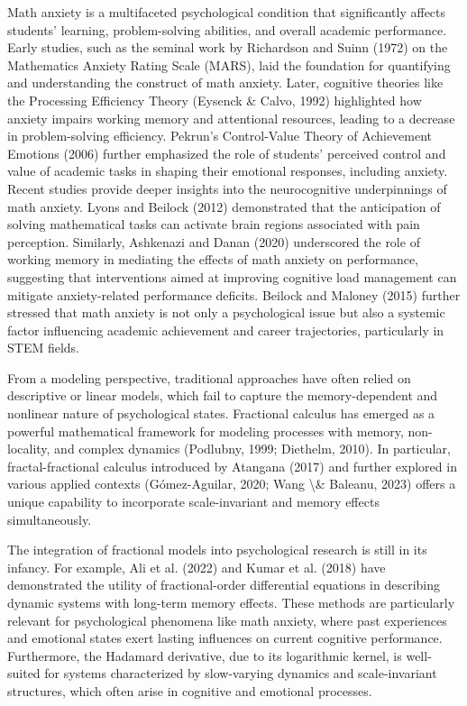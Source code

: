 \documentclass[10pt]{NSP1}
\begin{document}
Math anxiety is a multifaceted psychological condition that significantly affects students’ learning, problem-solving abilities, and overall academic performance. Early studies, such as the seminal work by Richardson and Suinn (1972) on the Mathematics Anxiety Rating Scale (MARS), laid the foundation for quantifying and understanding the construct of math anxiety. Later, cognitive theories like the Processing Efficiency Theory (Eysenck \& Calvo, 1992) highlighted how anxiety impairs working memory and attentional resources, leading to a decrease in problem-solving efficiency. Pekrun’s Control-Value Theory of Achievement Emotions (2006) further emphasized the role of students’ perceived control and value of academic tasks in shaping their emotional responses, including anxiety. Recent studies provide deeper insights into the neurocognitive underpinnings of math anxiety. Lyons and Beilock (2012) demonstrated that the anticipation of solving mathematical tasks can activate brain regions associated with pain perception. Similarly, Ashkenazi and Danan (2020) underscored the role of working memory in mediating the effects of math anxiety on performance, suggesting that interventions aimed at improving cognitive load management can mitigate anxiety-related performance deficits. Beilock and Maloney (2015) further stressed that math anxiety is not only a psychological issue but also a systemic factor influencing academic achievement and career trajectories, particularly in STEM fields.

From a modeling perspective, traditional approaches have often relied on descriptive or linear models, which fail to capture the memory-dependent and nonlinear nature of psychological states. Fractional calculus has emerged as a powerful mathematical framework for modeling processes with memory, non-locality, and complex dynamics (Podlubny, 1999; Diethelm, 2010). In particular, fractal-fractional calculus introduced by Atangana (2017) and further explored in various applied contexts (Gómez-Aguilar, 2020; Wang \textbackslash{}\& Baleanu, 2023) offers a unique capability to incorporate scale-invariant and memory effects simultaneously.

The integration of fractional models into psychological research is still in its infancy. For example, Ali et al. (2022) and Kumar et al. (2018) have demonstrated the utility of fractional-order differential equations in describing dynamic systems with long-term memory effects. These methods are particularly relevant for psychological phenomena like math anxiety, where past experiences and emotional states exert lasting influences on current cognitive performance. Furthermore, the Hadamard derivative, due to its logarithmic kernel, is well-suited for systems characterized by slow-varying dynamics and scale-invariant structures, which often arise in cognitive and emotional processes.
\end{document}
